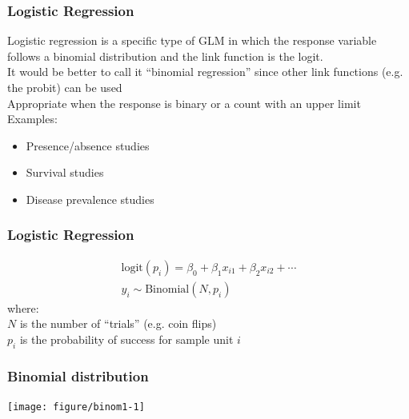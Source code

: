 \documentclass[color=usenames,dvipsnames]{beamer}\usepackage[]{graphicx}\usepackage[]{color}
\newenvironment{knitrout}{}{} %
\begin{document}
\begin{frame}
  \frametitle{Logistic Regression}
  Logistic regression is a specific type of GLM in which the
      response variable follows a binomial distribution and the link
      function is the logit. \\
  \pause
  \vfill
  It would be better to call it ``binomial regression'' since other
      link functions (e.g. the probit) can be used \\
  \pause
  \vfill
  Appropriate when the response is binary or a count with an
  upper limit
  \pause
  \vfill
  {Examples:}
      \begin{itemize}
        \normalsize
        \item Presence/absence studies
        \item Survival studies
        \item Disease prevalence studies
      \end{itemize}
\end{frame}







\begin{frame}
  \frametitle{Logistic Regression}
    \begin{gather*}
      \mathrm{logit}(p_i) = \beta_0 + \beta_1 x_{i1} + \beta_2 x_{i2} + \cdots \\
      y_i \sim \mathrm{Binomial}(N, p_i)
  \end{gather*}
  \pause
  {where: \\}
  $N$ is the number of ``trials'' (e.g. coin flips) \\
  $p_i$ is the probability of success for sample unit $i$
\end{frame}



\begin{frame}[fragile]
  \frametitle{Binomial distribution}%
  \vspace{-0.4cm}
\begin{center}
\begin{knitrout}
\color{fgcolor}
\texttt{[image: figure/binom1-1]} 
\end{knitrout}
\end{center}
\vfill
\end{frame}
\end{document}
